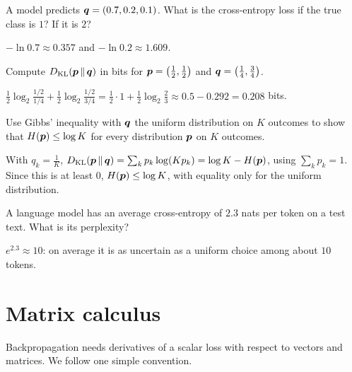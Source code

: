 \begin{exercise}
A model predicts $\bm{q} = (0.7, 0.2, 0.1)$. What is the cross-entropy loss if the
true class is $1$? If it is $2$?
\end{exercise}
\begin{solution}
$-\ln0.7 \approx 0.357$ and $-\ln0.2 \approx 1.609$.
\end{solution}

\begin{exercise}
Compute $D_{\operatorname{KL}}(\bm{p} \,\Vert\, \bm{q})$ in bits for $\bm{p} = \left(\tfrac12, \tfrac12\right)$
and $\bm{q} = \left(\tfrac14, \tfrac34\right)$.
\end{exercise}
\begin{solution}
$\tfrac12\log_2\tfrac{1/2}{1/4} + \tfrac12\log_2\tfrac{1/2}{3/4} = \tfrac12\cdot1 +
\tfrac12\log_2\tfrac23 \approx 0.5 - 0.292 = 0.208$ bits.
\end{solution}

\begin{exercise}
Use Gibbs' inequality with $\bm{q}$ the uniform distribution on $K$ outcomes to show
that $H(\bm{p}) \le \log K$ for every distribution $\bm{p}$ on $K$ outcomes.
\end{exercise}
\begin{solution}
With $q_k = \tfrac1K$, $D_{\operatorname{KL}}(\bm{p} \,\Vert\, \bm{q}) = \sum_kp_k\log(Kp_k) = \log K
- H(\bm{p})$, using $\sum_kp_k = 1$. Since this is at least $0$, $H(\bm{p}) \le \log K$,
with equality only for the uniform distribution.
\end{solution}

\begin{exercise}
A language model has an average cross-entropy of $2.3$ nats per token on a test
text. What is its perplexity?
\end{exercise}
\begin{solution}
$e^{2.3} \approx 10$: on average it is as uncertain as a uniform choice among
about $10$ tokens.
\end{solution}

\section{Matrix calculus}\label{sec:matrix-calculus}

Backpropagation needs derivatives of a scalar loss with respect to vectors and
matrices. We follow one simple convention.

